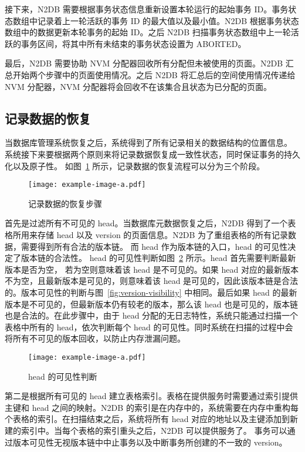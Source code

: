 接下来，N2DB 需要根据事务状态信息重新设置本轮运行的起始事务 ID。事务状态数组中记录着上一轮活跃的事务 ID 的最大值以及最小值。N2DB 根据事务状态数组中的数据更新本轮事务的起始 ID。之后 N2DB 扫描事务状态数组中上一轮活跃的事务区间，将其中所有未结束的事务状态设置为 ABORTED。

最后，N2DB 需要协助 NVM 分配器回收所有分配但未被使用的页面。N2DB 汇总开始两个步骤中的页面使用情况。之后 N2DB 将汇总后的空间使用情况传递给 NVM 分配器，NVM 分配器将会回收不在该集合且状态为已分配的页面。



\subsection{记录数据的恢复}
\label{ssec:record-recovery}

当数据库管理系统恢复之后，系统得到了所有记录相关的数据结构的位置信息。
系统接下来要根据两个原则来将记录数据恢复成一致性状态，同时保证事务的持久化以及原子性。
如图~\ref{fig:record-recovery} 所示，记录数据的恢复流程可以分为三个阶段。

\begin{figure}[ht]
    \centering
    \texttt{[image: example-image-a.pdf]}
    \caption{记录数据的恢复步骤}
    \label{fig:record-recovery}
\end{figure}

首先是过滤所有不可见的 head。当数据库元数据恢复之后，N2DB 得到了一个表格所用来存储 head 以及 version 的页面信息。N2DB 为了重组表格的所有记录数据，需要得到所有合法的版本链。
而 head 作为版本链的入口，head 的可见性决定了版本链的合法性。
head 的可见性判断如图~\ref{fig:head-visibility} 所示。head 首先需要判断最新版本是否为空，
若为空则意味着该 head 是不可见的。如果 head 对应的最新版本不为空，且最新版本是可见的，则意味着该 head 是可见的，因此该版本链是合法的。版本可见性的判断与图~\ref{fig:version-visibility} 中相同。最后如果 head 的最新版本是不可见的，但最新版本仍有较老的版本，那么该 head 也是可见的，版本链也是合法的。在此步骤中，由于 head 分配的无日志特性，系统只能通过扫描一个表格中所有的 head，依次判断每个 head 的可见性。同时系统在扫描的过程中会将所有不可见的版本回收，以防止内存泄漏问题。

\begin{figure}[ht]
    \centering
    \texttt{[image: example-image-a.pdf]}
    \caption{head 的可见性判断}
    \label{fig:head-visibility}
\end{figure}

第二是根据所有可见的 head 建立表格索引。表格在提供服务时需要通过索引提供主键和 head 之间的映射。N2DB 的索引是在内存中的，系统需要在内存中重构每个表格的索引。在扫描结束之后，系统将所有 head 对应的地址以及主键添加到新建的索引中。当每个表格的索引重头之后，N2DB 可以提供服务了。
事务可以通过版本可见性无视版本链中中止事务以及中断事务所创建的不一致的 version。

